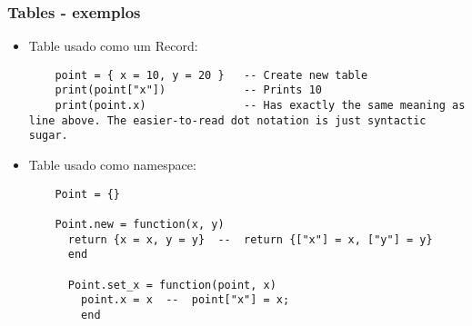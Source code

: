 \documentclass{ime-beamer}
\begin{document}

\begin{frame}[fragile]
  \frametitle{Tables - exemplos}
  \begin{block}{}
    \begin{itemize}
      \item Table usado como um Record: 
        \begin{lstlisting}
    point = { x = 10, y = 20 }   -- Create new table
    print(point["x"])            -- Prints 10
    print(point.x)               -- Has exactly the same meaning as line above. The easier-to-read dot notation is just syntactic sugar.
        \end{lstlisting}
      \item Table usado como namespace:
        \begin{lstlisting}
    Point = {}
     
    Point.new = function(x, y)
      return {x = x, y = y}  --  return {["x"] = x, ["y"] = y}
      end
       
      Point.set_x = function(point, x)
        point.x = x  --  point["x"] = x;
        end
        \end{lstlisting}
    \end{itemize}
  \end{block}
\end{frame}
\end{document}
